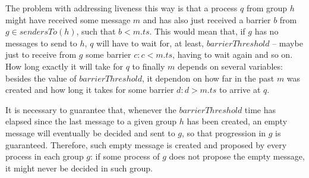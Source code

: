 \documentclass[times, 10pt]{article}
\begin{document}
The problem with addressing liveness this way is that a process $q$ from group $h$ might have received some message $m$ and has also just received a barrier $b$ from $g \in sendersTo(h)$, such that $b < m.ts$. This would mean that, if $g$ has no messages to send to $h$, $q$ will have to wait for, at least, $barrierThreshold$ -- maybe just to receive from $g$ some barrier $c : c < m.ts$, having to wait again and so on. How long exactly it will take for $q$ to finally \amdel{} $m$ depends on several variables: besides the value of $barrierThreshold$, it dependon on how far in the past $m$ was created and how long it takes for some barrier $d: d > m.ts$ to arrive at $q$.%

It is necessary to guarantee that, whenever the $barrierThreshold$ time has elapsed since the last message to a given group $h$ has been created, an empty message will eventually be decided and sent to $g$, so that progression in $g$ is guaranteed. Therefore, such empty message is created and proposed by every process in each group $g$: if some process of $g$ does not propose the empty message, it might never be decided in such group. %
\end{document}
